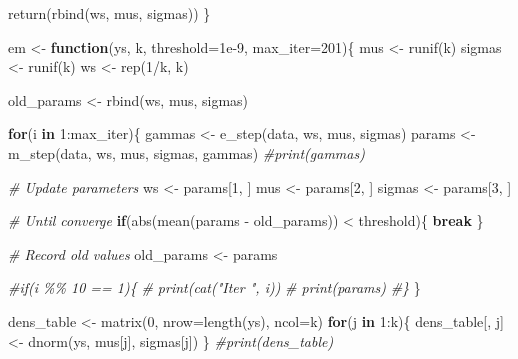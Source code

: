 \documentclass[
]{article}
\newenvironment{Shaded}{\begin{snugshade}}{\end{snugshade}}
\newcommand{\AttributeTok}[1]{\textcolor[rgb]{0.77,0.63,0.00}{#1}}
\newcommand{\CommentTok}[1]{\textcolor[rgb]{0.56,0.35,0.01}{\textit{#1}}}
\newcommand{\ControlFlowTok}[1]{\textcolor[rgb]{0.13,0.29,0.53}{\textbf{#1}}}
\newcommand{\DecValTok}[1]{\textcolor[rgb]{0.00,0.00,0.81}{#1}}
\newcommand{\FloatTok}[1]{\textcolor[rgb]{0.00,0.00,0.81}{#1}}
\newcommand{\FunctionTok}[1]{\textcolor[rgb]{0.00,0.00,0.00}{#1}}
\newcommand{\NormalTok}[1]{#1}
\newcommand{\OtherTok}[1]{\textcolor[rgb]{0.56,0.35,0.01}{#1}}
\newcommand{\SpecialCharTok}[1]{\textcolor[rgb]{0.00,0.00,0.00}{#1}}
\begin{document}
\begin{Shaded}
\begin{Highlighting}[]
  \FunctionTok{return}\NormalTok{(}\FunctionTok{rbind}\NormalTok{(ws, mus, sigmas))}
\NormalTok{\}}

\NormalTok{em }\OtherTok{\textless{}{-}} \ControlFlowTok{function}\NormalTok{(ys, k, }\AttributeTok{threshold=}\FloatTok{1e{-}9}\NormalTok{, }\AttributeTok{max\_iter=}\DecValTok{201}\NormalTok{)\{}
\NormalTok{  mus }\OtherTok{\textless{}{-}} \FunctionTok{runif}\NormalTok{(k)}
\NormalTok{  sigmas }\OtherTok{\textless{}{-}} \FunctionTok{runif}\NormalTok{(k)}
\NormalTok{  ws }\OtherTok{\textless{}{-}} \FunctionTok{rep}\NormalTok{(}\DecValTok{1}\SpecialCharTok{/}\NormalTok{k, k)}
  
\NormalTok{  old\_params }\OtherTok{\textless{}{-}} \FunctionTok{rbind}\NormalTok{(ws, mus, sigmas)}

  \ControlFlowTok{for}\NormalTok{(i }\ControlFlowTok{in} \DecValTok{1}\SpecialCharTok{:}\NormalTok{max\_iter)\{}
\NormalTok{    gammas }\OtherTok{\textless{}{-}} \FunctionTok{e\_step}\NormalTok{(data, ws, mus, sigmas)}
\NormalTok{    params }\OtherTok{\textless{}{-}} \FunctionTok{m\_step}\NormalTok{(data, ws, mus, sigmas, gammas)}
    \CommentTok{\#print(gammas)}
    
    \CommentTok{\# Update parameters}
\NormalTok{    ws }\OtherTok{\textless{}{-}}\NormalTok{ params[}\DecValTok{1}\NormalTok{, ]}
\NormalTok{    mus }\OtherTok{\textless{}{-}}\NormalTok{ params[}\DecValTok{2}\NormalTok{, ]}
\NormalTok{    sigmas }\OtherTok{\textless{}{-}}\NormalTok{ params[}\DecValTok{3}\NormalTok{, ]}
    
    \CommentTok{\# Until converge}
    \ControlFlowTok{if}\NormalTok{(}\FunctionTok{abs}\NormalTok{(}\FunctionTok{mean}\NormalTok{(params }\SpecialCharTok{{-}}\NormalTok{ old\_params)) }\SpecialCharTok{\textless{}}\NormalTok{ threshold)\{}
      \ControlFlowTok{break}
\NormalTok{    \}}
    
    \CommentTok{\# Record old values}
\NormalTok{    old\_params }\OtherTok{\textless{}{-}}\NormalTok{ params}
    
    \CommentTok{\#if(i \%\% 10 == 1)\{}
    \CommentTok{\#  print(cat("Iter ", i))}
    \CommentTok{\#  print(params)}
    \CommentTok{\#\}}
\NormalTok{  \}}
  
\NormalTok{  dens\_table }\OtherTok{\textless{}{-}} \FunctionTok{matrix}\NormalTok{(}\DecValTok{0}\NormalTok{, }\AttributeTok{nrow=}\FunctionTok{length}\NormalTok{(ys), }\AttributeTok{ncol=}\NormalTok{k)}
  \ControlFlowTok{for}\NormalTok{(j }\ControlFlowTok{in} \DecValTok{1}\SpecialCharTok{:}\NormalTok{k)\{}
\NormalTok{    dens\_table[, j] }\OtherTok{\textless{}{-}} \FunctionTok{dnorm}\NormalTok{(ys, mus[j], sigmas[j])}
\NormalTok{  \}}
  \CommentTok{\#print(dens\_table)}
  

\end{Highlighting}
\end{Shaded}
\end{document}
